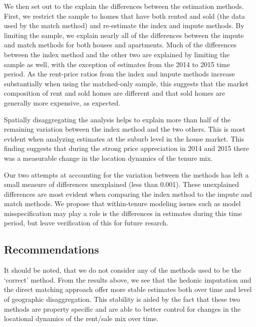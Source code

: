 \documentclass{article}\usepackage[]{graphicx}\usepackage[]{color}
\begin{document}
We then set out to the explain the differences between the estimation methods.  First, we restrict the sample to homes that have both rented and sold (the data used by the match method) and re-estimate the index and impute methods.  By limiting the sample, we explain nearly all of the differences between the impute and match methods for both houses and apartments. Much of the differences between the index method and the other two are explained by limiting the sample as well, with the exception of estimates from the 2014 to 2015 time period.  As the rent-price ratios from the index and impute methods increase substantially when using the matched-only sample, this suggests that the market composition of rent and sold homes are different and that sold homes are generally more expensive, as expected.\par

Spatially disaggregating the analysis helps to explain more than half of the remaining variation between the index method and the two others.  This is most evident when analyzing estimates at the suburb level in the house market. This finding suggests that during the strong price appreciation in 2014 and 2015 there was a measurable change in the location dynamics of the tenure mix.\par

Our two attempts at accounting for the variation between the methods has left a small measure of differences unexplained (less than 0.001). These unexplained differences are most evident when comparing the index method to the impute and match methods. We propose that within-tenure modeling issues such as model misspecification may play a role is the differences in estimates during this time period, but leave verification of this for future resarch.\par

\subsection*{Recommendations}

It should be noted, that we do not consider any of the methods used to be the `correct' method. From the results above, we see that the hedonic imputation and the direct matching approach offer more stable estimates both over time and level of geographic disaggregation. This stability is aided by the fact that these two methods are property specific and are able to better control for changes in the locational dynamics of the rent/sale mix over time.\par
\end{document}
